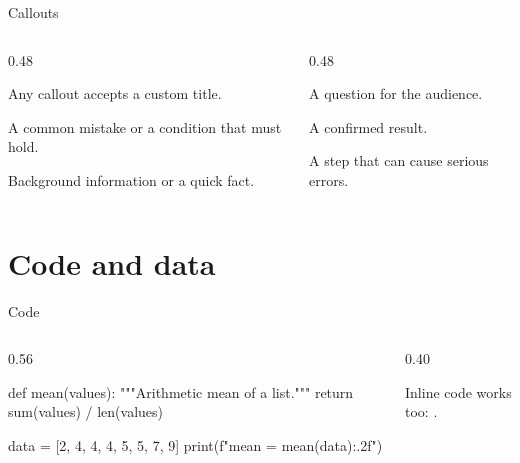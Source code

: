 \documentclass[aspectratio=169, 9pt, t, notheorems]{beamer}
\begin{document}
\begin{frame}{Callouts}
  \begin{columns}[T]
    \begin{column}{0.48\textwidth}
      \begin{tip}
        Any callout accepts a custom title.
      \end{tip}
      \begin{warning}
        A common mistake or a condition that must hold.
      \end{warning}
      \begin{info}
        Background information or a quick fact.
      \end{info}
    \end{column}
    \begin{column}{0.48\textwidth}
      \begin{question}
        A question for the audience.
      \end{question}
      \begin{success}
        A confirmed result.
      \end{success}
      \begin{danger}
        A step that can cause serious errors.
      \end{danger}
    \end{column}
  \end{columns}
\end{frame}

\section{Code and data}

\begin{frame}[fragile]{Code}
  \begin{columns}[T]
    \begin{column}{0.56\textwidth}
\begin{python}[example.py]
def mean(values):
    """Arithmetic mean of a list."""
    return sum(values) / len(values)

data = [2, 4, 4, 4, 5, 5, 7, 9]
print(f"mean = {mean(data):.2f}")
\end{python}
    \end{column}
    \begin{column}{0.40\textwidth}
      Inline code works too: .
    \end{column}
  \end{columns}
\end{frame}
\end{document}
